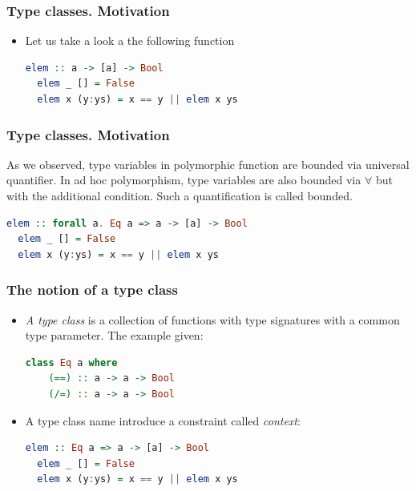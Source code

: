 \documentclass[10pt,pdf,utf8,russian,aspectratio=169]{beamer}
\begin{document}
\begin{frame}[fragile]
  \frametitle{Type classes. Motivation}

\begin{itemize}
  \item Let us take a look a the following function

  \begin{lstlisting}[language=Haskell]
  elem :: a -> [a] -> Bool
  elem _ [] = False
  elem x (y:ys) = x == y || elem x ys
  \end{lstlisting}

 
\end{itemize}
\end{frame}

\begin{frame}[fragile]
  \frametitle{Type classes. Motivation}
  As we observed, type variables in polymorphic function are bounded via universal quantifier. In ad hoc polymorphism, type variables are also bounded via $\forall$ but with the additional condition. Such a quantification is called bounded.

  \begin{lstlisting}[language=Haskell]
  elem :: forall a. Eq a => a -> [a] -> Bool
  elem _ [] = False
  elem x (y:ys) = x == y || elem x ys
  \end{lstlisting}

\end{frame}

\begin{frame}[fragile]
  \frametitle{The notion of a type class}

\begin{itemize}
  \item \emph{A type class} is a collection of functions with type signatures with a common type parameter. The example given:

  \begin{lstlisting}[language=Haskell]
  class Eq a where
    (==) :: a -> a -> Bool
    (/=) :: a -> a -> Bool
  \end{lstlisting}

  \item A type class name introduce a constraint called \emph{context}:

  \begin{lstlisting}[language=Haskell]
  elem :: Eq a => a -> [a] -> Bool
  elem _ [] = False
  elem x (y:ys) = x == y || elem x ys
  \end{lstlisting}
\end{itemize}
\end{frame}
\end{document}
